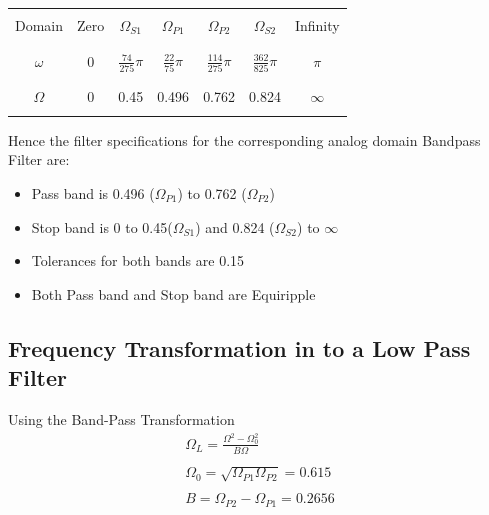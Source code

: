 \documentclass[12pt]{article}
\begin{document}
\begin{center}
	\begin{tabular}{ |c|c|c|c|c|c|c| }
		\hline
		&&&&&&\\
		Domain& Zero & $\Omega_{S1}$ & $\Omega_{P1}$ &$\Omega_{P2}$& $\Omega_{S2}$&Infinity\\
		&&&&&&\\
		\hline
		&&&&&&\\
		$\omega$ & 0 & $\frac{74}{275}\pi$ & $\frac{22}{75}\pi$& $\frac{114}{275}\pi$& $\frac{362}{825}\pi$& $\pi$\\
		&&&&&&\\
		\hline
		&&&&&&\\
		$\Omega$ & 0 & 0.45 & 0.496 & 0.762& 0.824 & $\infty$\\
		&&&&&&\\
		\hline
	\end{tabular}
\end{center}

\noindent Hence the filter specifications for the corresponding analog domain Bandpass Filter are:
\begin{itemize}
	\item Pass band is 0.496 ($\Omega_{P1}$)  to 0.762 ($\Omega_{P2}$) 
	\item Stop band is 0 to 0.45($\Omega_{S1}$) and 0.824 ($\Omega_{S2}$) to $\infty$
	\item Tolerances for both bands are 0.15
	\item Both Pass band and Stop band are Equiripple
\end{itemize}

\color{cyan}
\subsection{Frequency Transformation in to a Low Pass Filter}
\color{black}
Using the Band-Pass Transformation
\begin{gather*}
	\Omega_L = \frac{\Omega^2 - \Omega_0^2}{B\Omega}\\\\
	\Omega_0 = \sqrt{\Omega_{P1} \Omega_{P2}} = 0.615\\\\
	B = \Omega_{P2} - \Omega_{P1} = 0.2656
\end{gather*}
\end{document}
